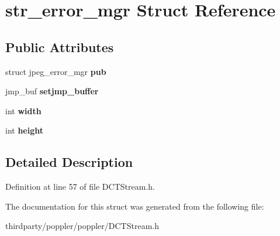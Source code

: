 \hypertarget{structstr__error__mgr}{}\section{str\+\_\+error\+\_\+mgr Struct Reference}
\label{structstr__error__mgr}
\subsection*{Public Attributes}
\begin{DoxyCompactItemize}
\item 
\mbox{\label{structstr__error__mgr_a05b4cb9f925a92945b4619345e6f8b5d}} 
struct jpeg\+\_\+error\+\_\+mgr {\bfseries pub}
\item 
\mbox{\label{structstr__error__mgr_a50a95ed3aeb4ce7607c546714df28d82}} 
jmp\+\_\+buf {\bfseries setjmp\+\_\+buffer}
\item 
\mbox{\label{structstr__error__mgr_adcce9cef1a6872bf74babbf10d9dba5a}} 
int {\bfseries width}
\item 
\mbox{\label{structstr__error__mgr_a3a6e3c6925c33d77d15b1feb236ad408}} 
int {\bfseries height}
\end{DoxyCompactItemize}


\subsection{Detailed Description}


Definition at line 57 of file D\+C\+T\+Stream.\+h.



The documentation for this struct was generated from the following file\+:\begin{DoxyCompactItemize}
\item 
thirdparty/poppler/poppler/D\+C\+T\+Stream.\+h\end{DoxyCompactItemize}
